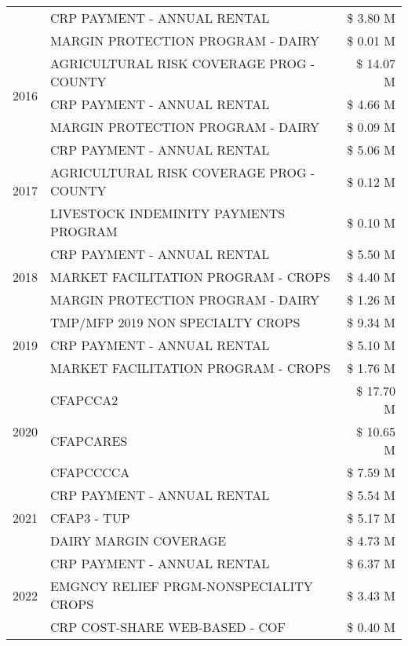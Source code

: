 \begin{tabular}{llr}
 & CRP PAYMENT - ANNUAL RENTAL & \$ 3.80 M \\
 & MARGIN PROTECTION PROGRAM - DAIRY & \$ 0.01 M \\
\cline{1-3}
\multirow[t]{3}{*}{2016} & AGRICULTURAL RISK COVERAGE PROG - COUNTY & \$ 14.07 M \\
 & CRP PAYMENT - ANNUAL RENTAL & \$ 4.66 M \\
 & MARGIN PROTECTION PROGRAM - DAIRY & \$ 0.09 M \\
\cline{1-3}
\multirow[t]{3}{*}{2017} & CRP PAYMENT - ANNUAL RENTAL & \$ 5.06 M \\
 & AGRICULTURAL RISK COVERAGE PROG - COUNTY & \$ 0.12 M \\
 & LIVESTOCK INDEMINITY PAYMENTS PROGRAM & \$ 0.10 M \\
\cline{1-3}
\multirow[t]{3}{*}{2018} & CRP PAYMENT - ANNUAL RENTAL & \$ 5.50 M \\
 & MARKET FACILITATION PROGRAM - CROPS & \$ 4.40 M \\
 & MARGIN PROTECTION PROGRAM - DAIRY & \$ 1.26 M \\
\cline{1-3}
\multirow[t]{3}{*}{2019} & TMP/MFP 2019 NON SPECIALTY CROPS & \$ 9.34 M \\
 & CRP PAYMENT - ANNUAL RENTAL & \$ 5.10 M \\
 & MARKET FACILITATION PROGRAM - CROPS & \$ 1.76 M \\
\cline{1-3}
\multirow[t]{3}{*}{2020} & CFAPCCA2 & \$ 17.70 M \\
 & CFAPCARES & \$ 10.65 M \\
 & CFAPCCCCA & \$ 7.59 M \\
\cline{1-3}
\multirow[t]{3}{*}{2021} & CRP PAYMENT - ANNUAL RENTAL & \$ 5.54 M \\
 & CFAP3 - TUP & \$ 5.17 M \\
 & DAIRY MARGIN COVERAGE & \$ 4.73 M \\
\cline{1-3}
\multirow[t]{3}{*}{2022} & CRP PAYMENT - ANNUAL RENTAL & \$ 6.37 M \\
 & EMGNCY RELIEF PRGM-NONSPECIALITY CROPS & \$ 3.43 M \\
 & CRP COST-SHARE WEB-BASED - COF & \$ 0.40 M \\
\cline{1-3}
\bottomrule
\end{tabular}
